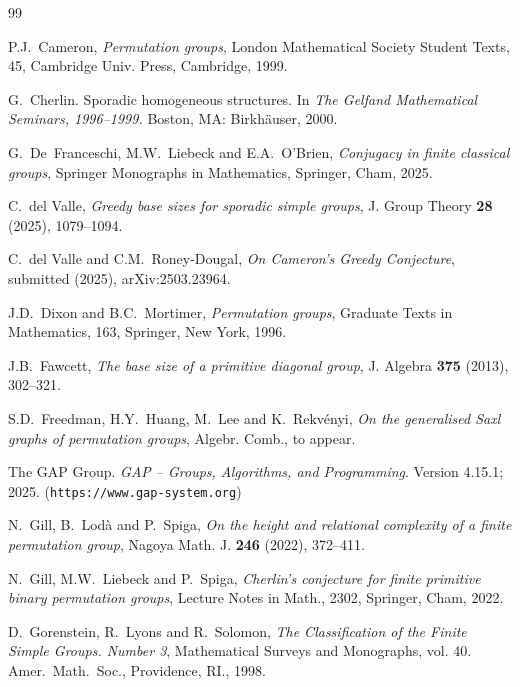 \documentclass[twoside,a4paper,reqno,11pt]{amsart}
\newcommand{\<}{\langle}
\renewcommand{\>}{\rangle}
\theoremstyle{definition}
\begin{document}
\begin{thebibliography}{99}

    P.J.~Cameron, {\it Permutation groups}, London Mathematical Society Student Texts, 45, Cambridge Univ. Press, Cambridge, 1999.
    
    G.~Cherlin. Sporadic homogeneous structures. In \emph{The Gelfand Mathematical Seminars, 1996–1999.} Boston, MA: Birkh\"auser, 2000.

    G.~De~Franceschi, M.W.~Liebeck and E.A.~O'Brien, {\it Conjugacy in finite classical groups}, Springer Monographs in Mathematics, Springer, Cham, 2025.
    
    C.~del Valle, \textit{Greedy base sizes for sporadic simple groups}, J. Group Theory \textbf{28} (2025), 1079–1094.
    
    C.~del Valle and C.M.~Roney-Dougal, \textit{On Cameron's Greedy Conjecture}, submitted (2025), arXiv:2503.23964.

    J.D.~Dixon and B.C.~Mortimer, {\it Permutation groups}, Graduate Texts in Mathematics, 163, Springer, New York, 1996.
    
	J.B.~Fawcett, \textit{The base size of a primitive diagonal group}, J. Algebra \textbf{375} (2013), 302–321.
	
	S.D.~Freedman, H.Y.~Huang, M.~Lee and K.~Rekv\'enyi, \textit{On the generalised Saxl graphs of permutation groups}, Algebr. Comb., to appear.

    The GAP Group. \textit{GAP -- Groups, Algorithms, and Programming}. Version 4.15.1; 2025. (\texttt{https://www.gap-system.org})
    
    N.~Gill, B.~Lod\`a and P.~Spiga, \textit{On the height and relational complexity of a finite permutation group}, Nagoya Math. J. \textbf{246} (2022), 372–411.
    
	N.~Gill, M.W.~Liebeck and P.~Spiga, \textit{Cherlin's conjecture for finite primitive binary permutation groups}, Lecture Notes in Math., 2302, Springer, Cham, 2022.
	
	D.~Gorenstein, R.~Lyons and R.~Solomon, \textit{The Classification of the	Finite Simple Groups. Number 3}, Mathematical Surveys and Monographs, vol. 40. Amer.~Math.~Soc., Providence, RI., 1998.
	

\end{thebibliography}
\end{document}
